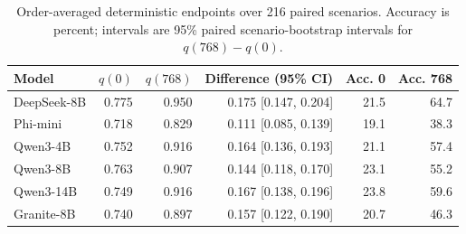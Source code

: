 \begin{table}[H]
\centering
\caption{Order-averaged deterministic endpoints over 216 paired scenarios. Accuracy is percent; intervals are 95\% paired scenario-bootstrap intervals for $q(768)-q(0)$.}
\label{tab:crossmodel}
\small
\setlength{\tabcolsep}{3.5pt}
\begin{tabular}{lrrrrr}
\toprule
Model & $q(0)$ & $q(768)$ & Difference (95\% CI) & Acc. 0 & Acc. 768 \\
\midrule
DeepSeek-8B & 0.775 & 0.950 & 0.175 [0.147, 0.204] & 21.5 & 64.7 \\
Phi-mini & 0.718 & 0.829 & 0.111 [0.085, 0.139] & 19.1 & 38.3 \\
Qwen3-4B & 0.752 & 0.916 & 0.164 [0.136, 0.193] & 21.1 & 57.4 \\
Qwen3-8B & 0.763 & 0.907 & 0.144 [0.118, 0.170] & 23.1 & 55.2 \\
Qwen3-14B & 0.749 & 0.916 & 0.167 [0.138, 0.196] & 23.8 & 59.6 \\
Granite-8B & 0.740 & 0.897 & 0.157 [0.122, 0.190] & 20.7 & 46.3 \\
\bottomrule
\end{tabular}
\end{table}
